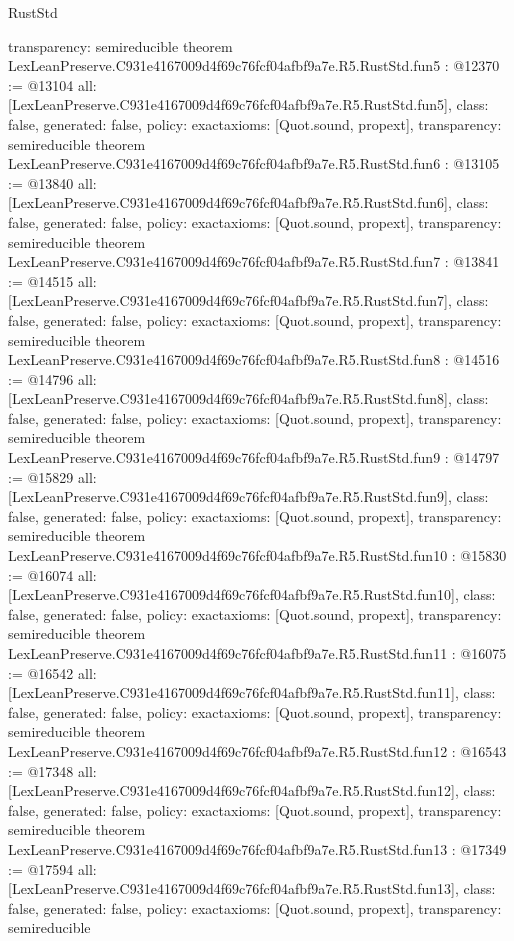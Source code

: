 \begin{lexlean}{RustStd}
\begin{coremodule}
{  transparency: semireducible
}
theorem LexLeanPreserve.C931e4167009d4f69c76fcf04afbf9a7e.R5.RustStd.fun5 : @12370 := @13104 {
  all: [LexLeanPreserve.C931e4167009d4f69c76fcf04afbf9a7e.R5.RustStd.fun5],
  class: false,
  generated: false,
  policy: exact{axioms: [Quot.sound, propext]},
  transparency: semireducible
}
theorem LexLeanPreserve.C931e4167009d4f69c76fcf04afbf9a7e.R5.RustStd.fun6 : @13105 := @13840 {
  all: [LexLeanPreserve.C931e4167009d4f69c76fcf04afbf9a7e.R5.RustStd.fun6],
  class: false,
  generated: false,
  policy: exact{axioms: [Quot.sound, propext]},
  transparency: semireducible
}
theorem LexLeanPreserve.C931e4167009d4f69c76fcf04afbf9a7e.R5.RustStd.fun7 : @13841 := @14515 {
  all: [LexLeanPreserve.C931e4167009d4f69c76fcf04afbf9a7e.R5.RustStd.fun7],
  class: false,
  generated: false,
  policy: exact{axioms: [Quot.sound, propext]},
  transparency: semireducible
}
theorem LexLeanPreserve.C931e4167009d4f69c76fcf04afbf9a7e.R5.RustStd.fun8 : @14516 := @14796 {
  all: [LexLeanPreserve.C931e4167009d4f69c76fcf04afbf9a7e.R5.RustStd.fun8],
  class: false,
  generated: false,
  policy: exact{axioms: [Quot.sound, propext]},
  transparency: semireducible
}
theorem LexLeanPreserve.C931e4167009d4f69c76fcf04afbf9a7e.R5.RustStd.fun9 : @14797 := @15829 {
  all: [LexLeanPreserve.C931e4167009d4f69c76fcf04afbf9a7e.R5.RustStd.fun9],
  class: false,
  generated: false,
  policy: exact{axioms: [Quot.sound, propext]},
  transparency: semireducible
}
theorem LexLeanPreserve.C931e4167009d4f69c76fcf04afbf9a7e.R5.RustStd.fun10 : @15830 := @16074 {
  all: [LexLeanPreserve.C931e4167009d4f69c76fcf04afbf9a7e.R5.RustStd.fun10],
  class: false,
  generated: false,
  policy: exact{axioms: [Quot.sound, propext]},
  transparency: semireducible
}
theorem LexLeanPreserve.C931e4167009d4f69c76fcf04afbf9a7e.R5.RustStd.fun11 : @16075 := @16542 {
  all: [LexLeanPreserve.C931e4167009d4f69c76fcf04afbf9a7e.R5.RustStd.fun11],
  class: false,
  generated: false,
  policy: exact{axioms: [Quot.sound, propext]},
  transparency: semireducible
}
theorem LexLeanPreserve.C931e4167009d4f69c76fcf04afbf9a7e.R5.RustStd.fun12 : @16543 := @17348 {
  all: [LexLeanPreserve.C931e4167009d4f69c76fcf04afbf9a7e.R5.RustStd.fun12],
  class: false,
  generated: false,
  policy: exact{axioms: [Quot.sound, propext]},
  transparency: semireducible
}
theorem LexLeanPreserve.C931e4167009d4f69c76fcf04afbf9a7e.R5.RustStd.fun13 : @17349 := @17594 {
  all: [LexLeanPreserve.C931e4167009d4f69c76fcf04afbf9a7e.R5.RustStd.fun13],
  class: false,
  generated: false,
  policy: exact{axioms: [Quot.sound, propext]},
  transparency: semireducible
}
\end{coremodule}
\end{lexlean}
